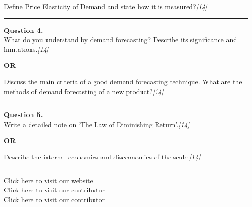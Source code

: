 \documentclass[11pt,a4paper]{article}
\newcommand{\pts}[1]{\hfill   \textit{[#1]}}
\begin{document}
Define Price Elasticity of Demand and state how it is measured?\pts{14}

\medskip\rule{\linewidth}{0.2pt}




\noindent   \textbf{Question 4.} \\
What do you understand by demand forecasting? Describe its significance and limitations.\pts{14}

\centerline{   \textbf{OR}}

Discuss the main criteria of a good demand forecasting technique. What are the methods of demand forecasting of a new product?\pts{14}

\medskip\rule{\linewidth}{0.2pt}




\noindent   \textbf{Question 5.} \\
Write a detailed note on `The Law of Diminishing Return'.\pts{14}

\centerline{   \textbf{OR}}

Describe the internal economies and diseconomies of the scale.\pts{14}

\vfill
\rule{\linewidth}{0.4pt}

\begin{center}\small
\href{https://bhu-exam.vercel.app/}{Click here to visit our website}\\[4pt]
\href{https://me-aryan.vercel.app/}{Click here to visit our contributor}\\[4pt]
\href{https://quashan-me.vercel.app/}{Click here to visit our contributor}
\end{center}
\end{document}
